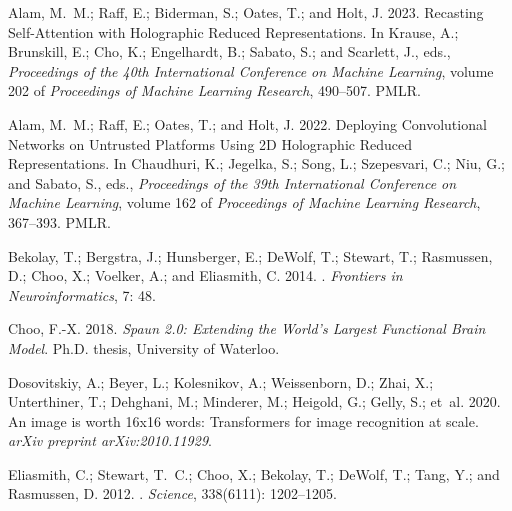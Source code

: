 \documentclass[letterpaper]{article} %
\begin{document}
\clearpage
\begin{thebibliography}{33}
    \providecommand{\natexlab}[1]{#1}
    
    Alam, M.~M.; Raff, E.; Biderman, S.; Oates, T.; and Holt, J. 2023.
    \newblock Recasting Self-Attention with Holographic Reduced Representations.
    \newblock In Krause, A.; Brunskill, E.; Cho, K.; Engelhardt, B.; Sabato, S.;
      and Scarlett, J., eds., \emph{Proceedings of the 40th International
      Conference on Machine Learning}, volume 202 of \emph{Proceedings of Machine
      Learning Research}, 490--507. PMLR.
    
    Alam, M.~M.; Raff, E.; Oates, T.; and Holt, J. 2022.
    \newblock Deploying Convolutional Networks on Untrusted Platforms Using 2{D}
      Holographic Reduced Representations.
    \newblock In Chaudhuri, K.; Jegelka, S.; Song, L.; Szepesvari, C.; Niu, G.; and
      Sabato, S., eds., \emph{Proceedings of the 39th International Conference on
      Machine Learning}, volume 162 of \emph{Proceedings of Machine Learning
      Research}, 367--393. PMLR.
    
    Bekolay, T.; Bergstra, J.; Hunsberger, E.; DeWolf, T.; Stewart, T.; Rasmussen,
      D.; Choo, X.; Voelker, A.; and Eliasmith, C. 2014.
    .
    \newblock \emph{Frontiers in Neuroinformatics}, 7: 48.
    
    Choo, F.-X. 2018.
    \newblock \emph{{Spaun 2.0: Extending the World's Largest Functional Brain
      Model}}.
    \newblock Ph.D. thesis, University of Waterloo.
    
    Dosovitskiy, A.; Beyer, L.; Kolesnikov, A.; Weissenborn, D.; Zhai, X.;
      Unterthiner, T.; Dehghani, M.; Minderer, M.; Heigold, G.; Gelly, S.; et~al.
      2020.
    \newblock An image is worth 16x16 words: Transformers for image recognition at
      scale.
    \newblock \emph{arXiv preprint arXiv:2010.11929}.
    
    Eliasmith, C.; Stewart, T.~C.; Choo, X.; Bekolay, T.; DeWolf, T.; Tang, Y.; and
      Rasmussen, D. 2012.
    .
    \newblock \emph{Science}, 338(6111): 1202--1205.
    

\end{thebibliography}
\end{document}
